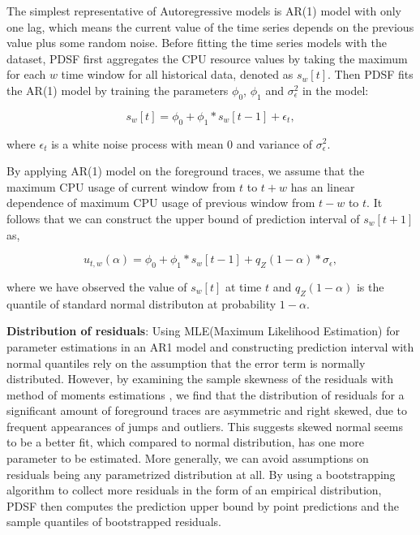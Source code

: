 \documentclass[sigplan,10pt,review,anonymous]{acmart}
\begin{document}
The simplest representative of Autoregressive models is AR(1) model with only
one lag, which means the current value of the time series depends on the
previous value plus some random noise. Before fitting the time series models
with the dataset, PDSF first aggregates the CPU resource values by
taking the maximum for each $w$ time window for all historical data, denoted as
$s_w[t]$. Then PDSF fits the AR(1) model by training the parameters
$\phi_0$, $\phi_1$ and $\sigma^2_{\epsilon}$ in the model:

\begin{equation}
  s_w[t] = \phi_0 + \phi_1 * s_w[t - 1] + \epsilon_t,
\end{equation}

where $\epsilon_t$ is a white noise process with mean $0$ and variance of
$\sigma^2_{\epsilon}$.

By applying AR(1) model on the foreground traces, we assume that the maximum CPU
usage of current window from $t$ to $t + w$ has an linear dependence of maximum
CPU usage of previous window from $t - w$ to $t$. It follows that we can
construct the upper bound of prediction interval of $s_w[t + 1]$ as,

\begin{equation}
  u_{t, w}(\alpha) = \phi_0 + \phi_1 * s_w[t - 1] + q_Z(1 - \alpha) * \sigma_{\epsilon},
\end{equation}

where we have observed the value of $s_w[t]$ at time $t$ and $q_Z(1 - \alpha)$
is the quantile of standard normal distributon at probability $1 - \alpha$.

\textbf{Distribution of residuals}: Using MLE(Maximum Likelihood Estimation) for
parameter estimations in an AR1 model and constructing prediction interval with
normal quantiles rely on the assumption that the error term is normally
distributed. However, by examining the sample skewness of the residuals with
method of moments estimations \cite{BONDON20091761}, we find that the
distribution of residuals for a significant amount of foreground traces are
asymmetric and right skewed, due to frequent appearances of jumps and outliers.
This suggests skewed normal seems to be a better fit, which compared to normal
distribution, has one more parameter to be estimated. More generally, we can
avoid assumptions on residuals being any parametrized distribution at all. By
using a bootstrapping algorithm \cite{PAN20161} to collect more residuals in the
form of an empirical distribution, PDSF then computes the prediction
upper bound by point predictions and the sample quantiles of bootstrapped
residuals.
\end{document}
